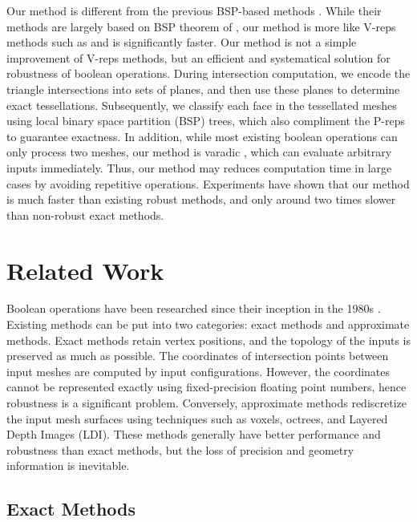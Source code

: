 Our method is different from the previous BSP-based methods \cite{bernstein2009fast,campen2010exact}.
While their methods are largely based on BSP theorem of \cite{naylor1990merging,thibault1987set}, our method is more like V-reps methods such as \cite{feito2013fast,zhou2016mesh} and is significantly faster. Our method is not a simple improvement of V-reps methods, but an efficient and systematical solution for robustness of boolean operations. During intersection computation, we encode the triangle intersections into sets of planes, and then use these planes to determine exact tessellations. Subsequently, we classify each face in the tessellated meshes using local binary space partition (BSP) trees, which also compliment the P-reps to guarantee exactness. In addition, while most existing boolean operations can only process two meshes, our method is varadic \cite{zhou2016mesh}, which can evaluate arbitrary inputs immediately. Thus, our method may reduces computation time in large cases by avoiding repetitive operations. Experiments have shown that our method is much faster than existing robust methods, and only around two times slower than non-robust exact methods.


\section{Related Work}


Boolean operations have been researched since their inception in the 1980s \cite{requicha1985boolean, laidlaw1986constructive}. Existing methods can be put into two categories: exact methods and approximate methods. Exact methods retain vertex positions, and the topology of the inputs is preserved as much as possible. The coordinates of intersection points between input meshes are computed by input configurations. However, the coordinates cannot be represented exactly using fixed-precision floating point numbers, hence robustness is a significant problem. Conversely, approximate methods rediscretize the input mesh surfaces using techniques such as voxels, octrees, and Layered Depth Images (LDI). These methods generally have better performance and robustness than exact methods, but the loss of precision and geometry information is inevitable.

\subsection{Exact Methods}


